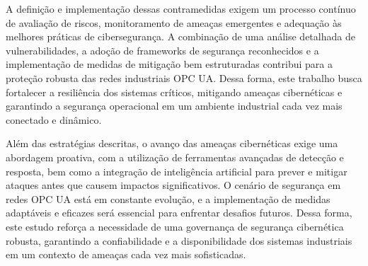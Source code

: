        A definição e implementação dessas contramedidas exigem um processo contínuo de avaliação de riscos, monitoramento de ameaças emergentes e adequação às melhores práticas de cibersegurança. A combinação de uma análise detalhada de vulnerabilidades, a adoção de frameworks de segurança reconhecidos e a implementação de medidas de mitigação bem estruturadas contribui para a proteção robusta das redes industriais OPC UA. Dessa forma, este trabalho busca fortalecer a resiliência dos sistemas críticos, mitigando ameaças cibernéticas e garantindo a segurança operacional em um ambiente industrial cada vez mais conectado e dinâmico.
        
        Além das estratégias descritas, o avanço das ameaças cibernéticas exige uma abordagem proativa, com a utilização de ferramentas avançadas de detecção e resposta, bem como a integração de inteligência artificial para prever e mitigar ataques antes que causem impactos significativos. O cenário de segurança em redes OPC UA está em constante evolução, e a implementação de medidas adaptáveis e eficazes será essencial para enfrentar desafios futuros. Dessa forma, este estudo reforça a necessidade de uma governança de segurança cibernética robusta, garantindo a confiabilidade e a disponibilidade dos sistemas industriais em um contexto de ameaças cada vez mais sofisticadas.
    


    